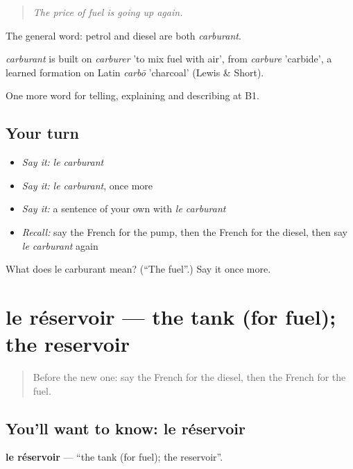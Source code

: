 \begin{quote}
\emph{The price of fuel is going up again.}
\end{quote}

The general word: petrol and diesel are both \emph{carburant}.

\begin{cousinweb}
\emph{carburant} is built on \emph{carburer} 'to mix fuel with air', from \emph{carbure} 'carbide', a learned formation on Latin \emph{carbō} 'charcoal' (Lewis \& Short).
\end{cousinweb}

\begin{grammarlens}[title={What you've built}]
One more word for telling, explaining and describing at B1.
\end{grammarlens}

\subsection*{Your turn}
\begin{itemize}
\raggedright
  \item \emph{Say it:} \emph{le carburant}
  \item \emph{Say it:} \emph{le carburant}, once more
  \item \emph{Say it:} a sentence of your own with \emph{le carburant}
  \item \emph{Recall:} say the French for the pump, then the French for the diesel, then say \emph{le carburant} again
\end{itemize}

\begin{tcolorbox}[breakable,colback=teal!4,colframe=teal!35!black,title={Before you move on}]
What does le carburant mean? (\textquotedblleft{}The fuel\textquotedblright{}.) Say it once more.
\end{tcolorbox}
\section[le réservoir]{le réservoir — the tank (for fuel); the reservoir}

\label{lesson:FR-C403-reservoir}



\begin{quote}
Before the new one: say the French for the diesel, then the French for the fuel.
\end{quote}

\subsection*{You'll want to know: le réservoir}
\textbf{le réservoir} — \textquotedblleft{}the tank (for fuel); the reservoir\textquotedblright{}.


